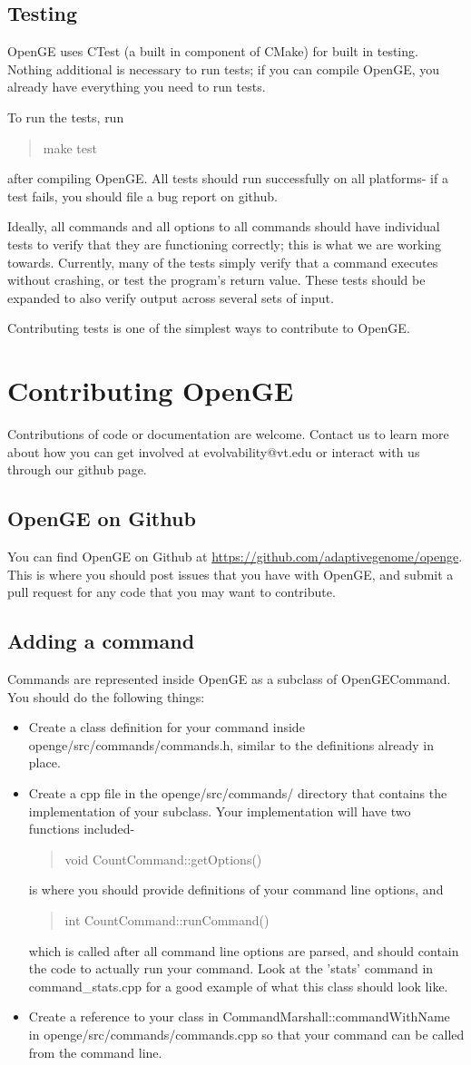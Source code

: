 \documentclass[11pt]{article}
\newcommand {\cmd}[1] {\begin{quote}#1\end{quote}}
\begin{document}
\subsection{Testing}
OpenGE uses CTest (a built in component of CMake) for built in testing. Nothing additional is necessary to run tests; if you can compile OpenGE, you already have everything you need to run tests.

To run the tests,  run
\cmd {make test}
after compiling OpenGE. All tests should run successfully on all platforms- if a test fails, you should file a bug report on github.

Ideally, all commands and all options to all commands should have individual tests to verify that they are functioning correctly; this is what we are working towards. Currently, many of the tests simply verify that a command executes without crashing, or test the program's return value. These tests should be expanded to also verify output across several sets of input.

Contributing tests is one of the simplest ways to contribute to OpenGE.

\section {Contributing OpenGE}
Contributions of code or documentation are welcome. Contact us to learn more about how you can get involved at evolvability@vt.edu or interact with us through our github page.

\subsection {OpenGE on Github}
You can find OpenGE on Github at \url{https://github.com/adaptivegenome/openge}. This is where you should post issues that you have with OpenGE, and submit a pull request for any code that you may want to contribute.
\subsection {Adding a command}
Commands are represented inside OpenGE as a subclass of OpenGECommand. You should do the following things:
\begin{itemize}
\item Create a class definition for your command inside openge/src/commands/commands.h, similar to the definitions already in place.
\item Create a cpp file in the openge/src/commands/ directory that contains the implementation of your subclass. Your implementation will have two functions included- 
\cmd {void CountCommand::getOptions()}
is where you should provide definitions of your command line options, and 
\cmd{int CountCommand::runCommand()}
which is called after all command line options are parsed, and should contain the code to actually run your command. Look at the 'stats' command in command\_stats.cpp for a good example of what this class should look like.
\item Create a reference to your class in CommandMarshall::commandWithName in openge/src/commands/commands.cpp so that your command can be called from the command line.
\end{itemize}
\end{document}
